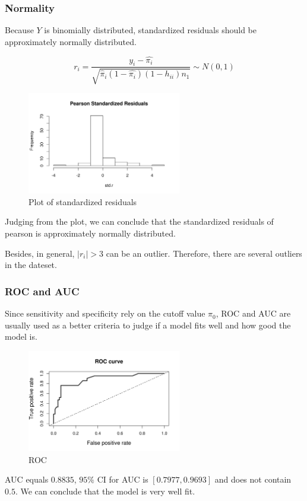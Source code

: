 \documentclass[a4paper,11pt,onecolumn,twoside]{article}
\begin{document}
\subsubsection{Normality}
Because $Y$ is binomially distributed, standardized residuals should be approximately normally distributed.\par
\begin{equation}
r_{i} = \frac{y_{i}-\hat{\pi_{i}}}{\sqrt{\hat\pi_{i}(1-\hat{\pi_{i}})(1-h_{ii})n_{1}}}\sim N(0,1)
\end{equation}
\begin{figure}[H]
	\centering
	\includegraphics[width=0.6\textwidth,height=0.3\textheight]{pearson_std_e.png}	
	\caption{Plot of standardized residuals}
\end{figure}
Judging from the plot, we can conclude that the standardized residuals of pearson is approximately normally distributed. \par Besides, in general, $|r_{i}|>3$ can be an outlier. Therefore, there are several outliers in the dateset.\par
\subsubsection{ROC and AUC}
Since sensitivity and specificity rely on the cutoff value $\pi_{0}$, ROC and AUC are usually used as a better criteria to judge if a model fits well and how good the model is.\par
\begin{figure}[H]
	\centering
	\includegraphics[width=0.6\textwidth,height=0.3\textheight]{auc.png}	
	\caption{ROC}
\end{figure}
AUC equals $0.8835$, $95\%$ CI for AUC is $[0.7977, 0.9693]$ and does not contain $0.5$. We can conclude that the model is very well fit.\par
\end{document}
